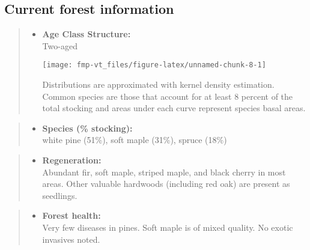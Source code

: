 \documentclass[]{tufte-handout}
\providecommand{\tightlist}{%
  \setlength{\itemsep}{0pt}\setlength{\parskip}{0pt}}
\begin{document}
\subsection{Current forest
information}\label{current-forest-information-1}

\begin{quote}
\begin{itemize}
\tightlist
\item
  \textbf{Age Class Structure:}\\
  \vspace{2pt} Two-aged\\

  \begin{marginfigure}
  \texttt{[image: fmp-vt\_files/figure-latex/unnamed-chunk-8-1]} \caption[Distributions are approximated with kernel density estimation]{Distributions are approximated with kernel density estimation. Common species are those that account for at least 8 percent of the total stocking and areas under each curve represent species basal areas.}\label{fig:unnamed-chunk-8}
  \end{marginfigure}
\end{itemize}
\end{quote}

\begin{quote}
\begin{itemize}
\tightlist
\item
  \textbf{Species (\% stocking):}\\
  \vspace{2pt} white pine (51\%), soft maple (31\%), spruce (18\%)
\end{itemize}
\end{quote}

\begin{quote}
\begin{itemize}
\tightlist
\item
  \textbf{Regeneration:}\\
  \vspace{2pt} Abundant fir, soft maple, striped maple, and black cherry
  in most areas. Other valuable hardwoods (including red oak) are
  present as seedlings.
\end{itemize}
\end{quote}

\begin{quote}
\begin{itemize}
\tightlist
\item
  \textbf{Forest health:}\\
  \vspace{2pt} Very few diseases in pines. Soft maple is of mixed
  quality. No exotic invasives noted.
\end{itemize}
\end{quote}
\end{document}
